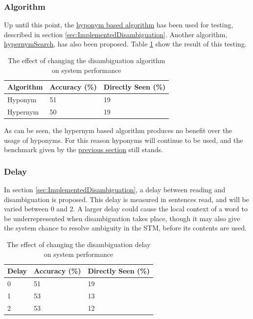 \documentclass[]{article}
\begin{document}
\subsubsection{Algorithm}
\label{sec:EvDisAlgorithm}
Up until this point, the \hyperref[lst:hyponymSearch]{hyponym based algorithm} has been used for testing, described in section \ref{sec:ImplementedDisambiguation}. Another algorithm, \hyperref[lst:hypernymSearch]{hypernymSearch}, has also been proposed. Table \ref{table:Algorithm} show the result of this testing.

\begin{table}
\begin{center}
\begin{tabular}{|p{7em}|p{7em}|p{7em}|}
	\hline
	Algorithm & Accuracy (\%) & Directly Seen (\%) \\
	\hline
	Hyponym & 51 & 19\\
	\hline
	Hypernym & 50 & 19\\
	\hline
\end{tabular}
\end{center}
\caption{The effect of changing the disambiguation algorithm on system performance}
\label{table:Algorithm}
\end{table}

As can be seen, the hypernym based algorithm produces no benefit over the usage of hyponyms. For this reason hyponyms will continue to be used, and the benchmark given by the \hyperref[sec:EvEpisodicBuffer]{previous section} still stands. 

\subsubsection{Delay}
\label{sec:EvDisDelay}
In section \ref{sec:ImplementedDisambiguation}, a delay between reading and disambiguation is proposed. This delay is measured in sentences read, and will be varied between 0 and 2. A larger delay could cause the local context of a word to be underrepresented when disambiguation takes place, though it may also give the system chance to resolve ambiguity in the STM, before its contents are used.

\begin{table}
\begin{center}
\begin{tabular}{|p{2em}|p{7em}|p{7em}|}
	\hline
	Delay & Accuracy (\%) & Directly Seen (\%) \\
	\hline
	0 & 51 & 19\\
	\hline
	1 & 53 & 13\\
	\hline
	2 & 53 & 12\\
	\hline
\end{tabular}
\end{center}
\caption{The effect of changing the disambiguation delay on system performance}
\label{table:Delay}
\end{table}
\end{document}
